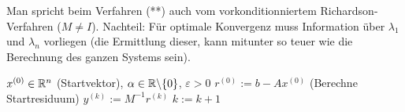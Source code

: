 \begin{bemerkung}
 Man spricht beim Verfahren (**) auch vom vorkonditionniertem Richardson-Verfahren ($M\neq I$). 
 Nachteil: Für optimale Konvergenz muss Information über $\lambda_1$ und $\lambda_n$ vorliegen (die Ermittlung dieser, kann mitunter so teuer wie die Berechnung des ganzen Systems sein).
 \end{bemerkung}

 \begin{algorithmus}
   \begin{algorithmic}[1]
     \Statex 
     \Statex\Init $x^{(0)}\in \mathbb{R}^n$ (Startvektor), $\alpha\in\mathbb{R} \backslash \{0\}$, $\varepsilon >0$
     \Statex
     \State  $r^{(0)} := b-Ax^{(0)}$ (Berechne Startresiduum)
      \State $y^{(k)} := M^{-1} r^{(k)}$
      \State $k:=k+1$
     \EndWhile  
   \end{algorithmic}
 \end{algorithmus}

